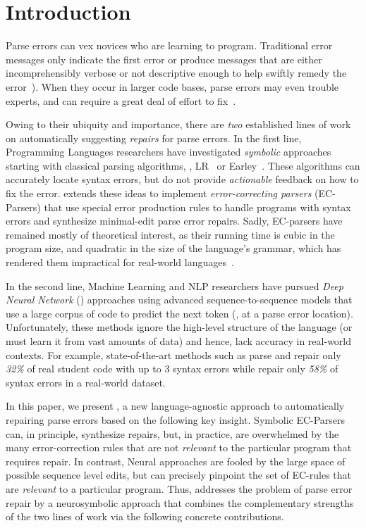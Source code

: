 
\section{Introduction}
\label{sec:intro}

Parse errors can vex novices who
are learning to program.
%
Traditional error messages
only indicate the first error
or produce messages that
are either incomprehensibly
verbose or not descriptive
enough to help swiftly remedy
the error~\citep{qian2017, VanDerSpek_2005}).
%
When they occur in larger code bases, parse errors
may even trouble experts, and can require a great deal of
effort to fix~\citep{Denny_2012, Ahadi_2018, Kummerfeld2003}.

Owing to their ubiquity and importance, there are \emph{two}
established lines of work on automatically suggesting \emph{repairs}
for parse errors.
%
In the first line, Programming Languages researchers
have investigated \emph{symbolic} approaches starting
with classical parsing algorithms, \eg, LR~\citep{Aho1974}
or Earley~\citep{Earley_1970}.
%
These algorithms can accurately locate syntax errors,
but do not provide \emph{actionable} feedback on how
to fix the error.
%
\citet{Aho_1972} extends these ideas to implement \emph{error-correcting
parsers} (EC-Parsers) that use special error production rules to handle programs
with syntax errors and synthesize minimal-edit parse error repairs.
%
Sadly, EC-parsers have remained mostly of theoretical
interest, as their running time is cubic in the
program size, and quadratic in the size of the language's
grammar, which has rendered them impractical for
real-world languages~\citep{McLean1996, Rajasekaran2014}.

In the second line, Machine Learning and NLP researchers have
pursued \emph{Deep Neural Network} (\dnn)
approaches using advanced sequence-to-sequence
models \citep{Sutskever_2014, Hardalov_2018}
that use a large corpus of code to predict
the next token (\eg, at a parse error location).
%
Unfortunately, these methods ignore the high-level structure
of the language (or must learn it from vast amounts
of data) and hence, lack accuracy in real-world contexts.
%
For example, state-of-the-art methods such as \citet{Ahmed_2021} parse and
repair only \emph{32\%} of real student code with up to 3 syntax errors
while \citet{Wu2020} repair only \emph{58\%} of syntax errors in a
real-world dataset.

In this paper, we present \toolname, a new language-agnostic approach to
automatically repairing parse errors based on the following key insight.
%
Symbolic EC-Parsers \citep{Aho_1972} can, in principle,
synthesize repairs, but, in practice, are overwhelmed by
the many error-correction rules that are not \emph{relevant}
to the particular program that requires repair.
%
In contrast, Neural approaches are fooled by the large
space of possible sequence level edits, but can precisely
pinpoint the set of EC-rules that are \emph{relevant}
to a particular program.
%
Thus, \toolname addresses the problem of parse error
repair by a neurosymbolic approach that combines
the complementary strengths of the two lines of work
via the following concrete contributions.

